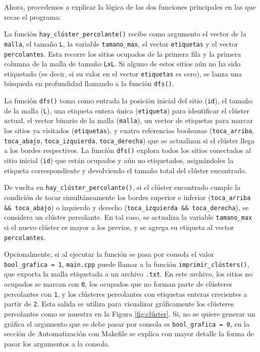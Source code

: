 \documentclass[%
 reprint,
 amsmath,amssymb,
 aps,
]{revtex4-2}
\begin{document}
Ahora, procedemos a explicar la lógica de las dos funciones principales en las que recae el programa:

La función \texttt{hay\_clúster\_percolante()} recibe como argumento el vector de la \texttt{malla}, el tamaño \texttt{L}, la variable \texttt{tamano\_max}, el vector \texttt{etiquetas} y el vector \texttt{percolantes}. Esta recorre los sitios ocupados de la primera fila y la primera columna de la malla de tamaño \texttt{LxL}. Si alguno de estos sitios aún no ha sido etiquetado (es decir, si su valor en el vector \texttt{etiquetas} es cero), se lanza una búsqueda en profundidad llamando a la función \texttt{dfs()}.

La función \texttt{dfs()} toma como entrada la posición inicial del sitio (\texttt{id}), el tamaño de la malla (\texttt{L}), una etiqueta entera única (\texttt{etiqueta}) para identificar el clúster actual, el vector binario de la malla (\texttt{malla}), un vector de etiquetas para marcar los sitios ya visitados (\texttt{etiquetas}), y cuatro referencias booleanas (\texttt{toca\_arriba}, \texttt{toca\_abajo}, \texttt{toca\_izquierda}, \texttt{toca\_derecha}) que se actualizan si el clúster llega a los bordes respectivos. La función \texttt{dfs()} explora todos los sitios conectados al sitio inicial (\texttt{id}) que están ocupados y aún no etiquetados, asignándoles la etiqueta correspondiente y devolviendo el tamaño total del clúster encontrado. 

De vuelta en \texttt{hay\_clúster\_percolante()}, si el clúster encontrado cumple la condición de tocar simultáneamente los bordes superior e inferior (\texttt{toca\_arriba \&\& toca\_abajo}) o izquierdo y derecho (\texttt{toca\_izquierda \&\& toca\_derecha}), se considera un clúster percolante. En tal caso, se actualiza la variable \texttt{tamano\_max} si el nuevo clúster es mayor a los previos, y se agrega su etiqueta al vector \texttt{percolantes}.

Opcionalmente, si al ejecutar la función se pasa por consola el valor \texttt{bool\_grafica = 1}, \texttt{main.cpp} puede llamar a la función \texttt{imprimir\_clústers()}, que exporta la malla etiquetada a un archivo \texttt{.txt}. En este archivo, los sitios no ocupados se marcan con \texttt{0}, los ocupados que no forman parte de clústeres percolantes con \texttt{1}, y los clústeres percolantes con etiquetas enteras crecientes a partir de \texttt{2}. Esta salida se utiliza para visualizar gráficamente los clústeres percolantes como se muestra en la Figura \ref{fig:clúster}. Si, no se quiere generar un gráfica el argumento que se debe pasar por consola es \texttt{bool\_grafica = 0}, en la sección de Automatización con Makefile se explica con mayor detalle la forma de pasar los argumentos a la consola.
\end{document}
